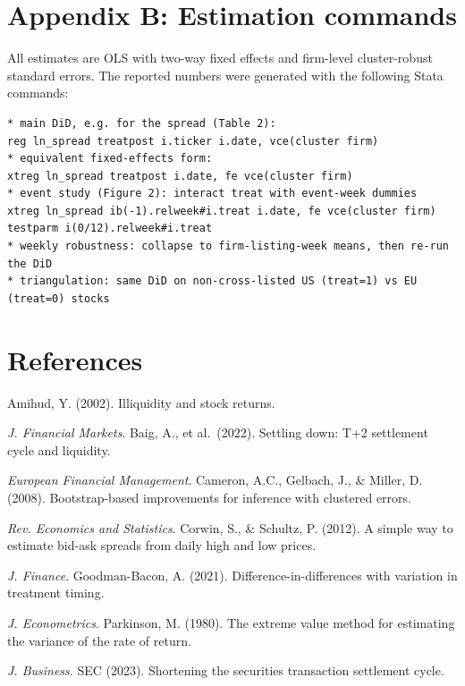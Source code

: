 \documentclass[11pt]{article}
\begin{document}
\section*{Appendix B: Estimation commands}
All estimates are OLS with two-way fixed effects and firm-level cluster-robust
standard errors. The reported
numbers were generated with the following Stata commands:

\begin{verbatim}
* main DiD, e.g. for the spread (Table 2):
reg ln_spread treatpost i.ticker i.date, vce(cluster firm)
* equivalent fixed-effects form:
xtreg ln_spread treatpost i.date, fe vce(cluster firm)
* event study (Figure 2): interact treat with event-week dummies
xtreg ln_spread ib(-1).relweek#i.treat i.date, fe vce(cluster firm)
testparm i(0/12).relweek#i.treat
* weekly robustness: collapse to firm-listing-week means, then re-run the DiD
* triangulation: same DiD on non-cross-listed US (treat=1) vs EU (treat=0) stocks
\end{verbatim}


\section*{References}
\quad  Amihud, Y. (2002). Illiquidity and stock returns. 

\textit{J. Financial Markets}.
Baig, A., et al.\ (2022). Settling down: T+2 settlement cycle and liquidity.

\textit{European Financial Management}.
Cameron, A.C., Gelbach, J., \& Miller, D. (2008). Bootstrap-based improvements for
inference with clustered errors. 

\textit{Rev. Economics and Statistics}.
Corwin, S., \& Schultz, P. (2012). A simple way to estimate bid-ask spreads from
daily high and low prices. 

\textit{J. Finance}.
Goodman-Bacon, A. (2021). Difference-in-differences with variation in treatment
timing. 

\textit{J. Econometrics}.
Parkinson, M. (1980). The extreme value method for estimating the variance of the
rate of return. 

\textit{J. Business}.
SEC (2023). Shortening the securities transaction settlement cycle.
\end{document}
